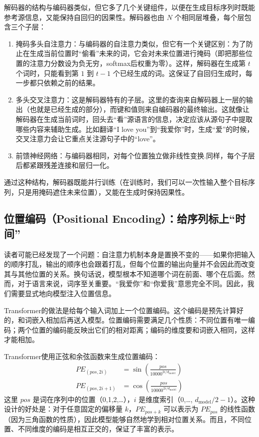 \documentclass[lang=cn,zihao=-4,a4paper,fontset=windows]{beautybook}
\begin{document}
解码器的结构与编码器类似，但它多了几个关键组件，以便在生成目标序列时既能参考源信息，又能保持自回归的因果性。解码器也由 \(N\) 个相同层堆叠，每个层包含三个子层：
\begin{enumerate}
\item 掩码多头自注意力：与编码器的自注意力类似，但它有一个关键区别：为了防止在生成当前位置时“偷看”未来的词，它会对未来位置进行掩码（即把那些位置的注意力分数设为负无穷，softmax后权重为零）。这样，解码器在生成第 \(t\) 个词时，只能看到第 \(1\) 到 \(t-1\) 个已经生成的词。这保证了自回归生成时，每一步都只依赖之前的结果。
\item 多头交叉注意力：这是解码器特有的子层。这里的查询来自解码器上一层的输出（也就是已经生成的部分），而键和值则来自编码器的最终输出。这就像让解码器在生成当前词时，回头去“看”源语言的信息，决定应该从源句子中提取哪些内容来辅助生成。比如翻译“I love you”到“我爱你”时，生成“爱”的时候，交叉注意力会让它重点关注源句子中的“love”。
\item 前馈神经网络：与编码器相同，对每个位置独立做非线性变换.同样，每个子层后都紧跟残差连接和层归一化。
\end{enumerate}
通过这种结构，解码器既能并行训练（在训练时，我们可以一次性输入整个目标序列，只是用掩码遮住未来位置），又能在生成时保持因果性。

\subsection{位置编码（Positional Encoding）：给序列标上“时间”}

读者可能已经发现了一个问题：自注意力机制本身是置换不变的——如果你把输入的顺序打乱，输出的顺序也会跟着打乱，但每个位置的输出向量并不会因此而改变其与其他位置的关系。换句话说，模型根本不知道哪个词在前面、哪个在后面。然而，对于语言来说，词序至关重要。“我爱你”和“你爱我”意思完全不同。因此，我们需要显式地向模型注入位置信息。

Transformer的做法是给每个输入词加上一个位置编码。这个编码是预先计算好的，和词嵌入相加后再送入模型。位置编码需要满足几个性质：不同位置有唯一编码；两个位置的编码能反映出它们的相对距离；编码的维度要和词嵌入相同，这样才能相加。

Transformer使用正弦和余弦函数来生成位置编码：
\[
\begin{aligned}
PE_{(pos, 2i)} &= \sin\left(\frac{pos}{10000^{2i/d_{\text{model}}}}\right) \\
PE_{(pos, 2i+1)} &= \cos\left(\frac{pos}{10000^{2i/d_{\text{model}}}}\right)
\end{aligned}
\]
这里 \(pos\) 是词在序列中的位置（0,1,2,…），\(i\) 是维度索引（0,…, \(d_{\text{model}}/2-1\)）。这种设计的好处是：对于任意固定的偏移量 \(k\)，\(PE_{pos+k}\) 可以表示为 \(PE_{pos}\) 的线性函数（因为三角函数的性质），因此模型能够自然地学到相对位置关系。而且，不同位置、不同维度的编码是相互正交的，保证了丰富的表示。
\end{document}
